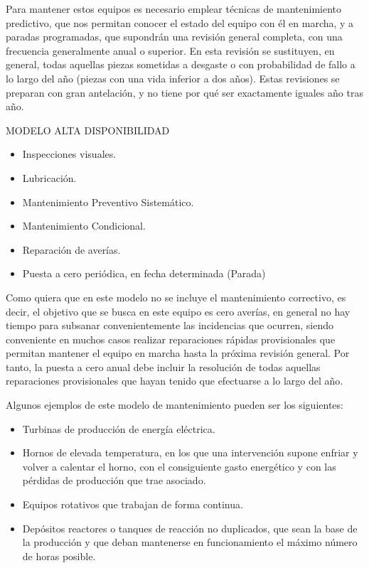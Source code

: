 Para mantener
estos equipos es necesario emplear técnicas de mantenimiento predictivo,
que nos permitan conocer el estado del equipo con él en marcha, y a paradas
programadas, que supondrán una revisión general completa, con una frecuencia generalmente anual o superior. En esta revisión se sustituyen, en general, todas aquellas piezas sometidas a desgaste o con probabilidad de fallo
a lo largo del año (piezas con una vida inferior a dos años). Estas revisiones
se preparan con gran antelación, y no tiene por qué ser exactamente iguales
año tras año.
\begin{tcolorbox}
MODELO ALTA DISPONIBILIDAD
\tcblower
\begin{itemize}
\item Inspecciones visuales.
\item Lubricación.
\item Mantenimiento Preventivo Sistemático.
\item Mantenimiento Condicional.
\item Reparación de averías.
\item Puesta a cero periódica, en fecha determinada (Parada)
\end{itemize}
\end{tcolorbox}
Como quiera que en este modelo no se incluye el mantenimiento correctivo, es decir, el objetivo que se busca en este equipo es cero averías, en
general no hay tiempo para subsanar convenientemente las incidencias que
ocurren, siendo conveniente en muchos casos realizar reparaciones rápidas
provisionales que permitan mantener el equipo en marcha hasta la próxima
revisión general. Por tanto, la puesta a cero anual debe incluir la resolución
de todas aquellas reparaciones provisionales que hayan tenido que efectuarse
a lo largo del año.

Algunos ejemplos de este modelo de mantenimiento pueden ser los siguientes:


\begin{itemize}
    \item Turbinas de producción de energía eléctrica. 
    \item Hornos de elevada temperatura, en los que una intervención supone
enfriar y volver a calentar el horno, con el consiguiente gasto energético y con las pérdidas de producción que trae asociado.
    \item Equipos rotativos que trabajan de forma continua.
    \item Depósitos reactores o tanques de reacción no duplicados, que sean la
base de la producción y que deban mantenerse en funcionamiento el
máximo número de horas posible.
\end{itemize}
